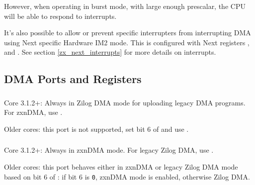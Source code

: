 {However, when operating in burst mode, with large enough prescalar, the CPU will be able to respond to interrupts.

It's also possible to allow or prevent specific interrupters from interrupting DMA using Next specific Hardware IM2 mode. This is configured with Next registers ,  and . See section \ref{zx_next_interrupts} for more details on interrupts.


\pagebreak
\subsection{DMA Ports and Registers}
\label{zx_next_dma_registers}

\subsubsection{}

Core 3.1.2+: Always in Zilog DMA mode for uploading legacy DMA programs. For zxnDMA, use .

Older cores: this port is not supported, set bit 6 of  and use .


\subsubsection{}

Core 3.1.2+: Always in zxnDMA mode. For legacy Zilog DMA, use .

Older cores: this port behaves either in zxnDMA or legacy Zilog DMA mode based on bit 6 of : if bit 6 is {\tt 0}, zxnDMA mode is enabled, otherwise Zilog DMA.


\subsubsection{}



\subsubsection{}

}
